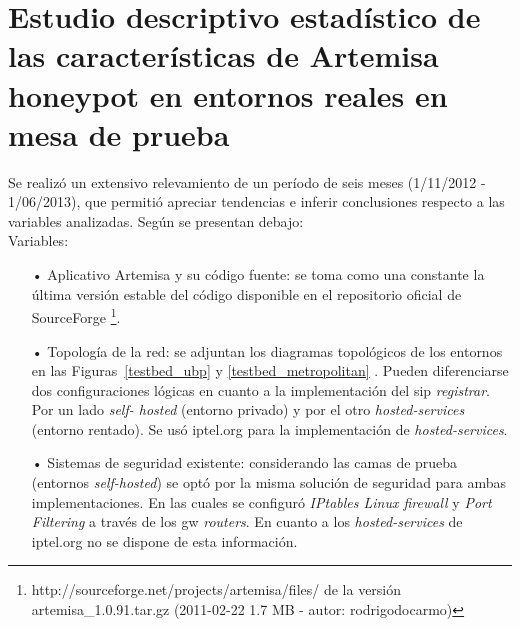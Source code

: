 \documentclass[a4paper,12pt]{report}
\begin{document}
\section{Estudio descriptivo estadístico de las características de Artemisa
honeypot en entornos reales en mesa de prueba}
\label{estudio_estadístico}

Se realizó un extensivo relevamiento de un período de seis
meses (1/11/2012 - 1/06/2013), que permitió apreciar tendencias e 
inferir conclusiones respecto a las variables analizadas. Según se
presentan debajo:\\

Variables:
\begin{itemize}
\item [•] Aplicativo Artemisa y su código fuente:
se toma como una constante la última versión estable del código disponible en el 
repositorio oficial de SourceForge \footnote{http://sourceforge.net/projects/artemisa/files/ de la versión
artemisa\_1.0.91.tar.gz (2011-02-22 1.7 MB - autor: rodrigodocarmo)}.
 
\item [•] Topología de la red: se adjuntan los diagramas topológicos de los
entornos en las Fi\-gu\-ras~\ref{testbed_ubp} y \ref{testbed_metropolitan} . Pueden diferenciarse dos configuraciones lógicas en
cuanto a la implementación del \ac{sip} \emph{registrar}. Por un lado \emph{self-
hosted} (entorno privado) y por el otro \emph{hosted-services} (entorno rentado). 
Se usó iptel.org para la implementación de \emph{hosted-services}.

\item [•] Sistemas de seguridad existente: 
considerando las camas de prueba (entornos \emph{self-hosted}) se optó por la
misma solución de seguridad para ambas implementaciones. En las cuales
se configuró \emph{IPtables Linux firewall} y \emph{Port Filtering} a través de los \ac{gw}
\emph{routers}. En cuanto a los \emph{hosted-services} de iptel.org no se dispone de esta
información.


\end{itemize}
\end{document}
